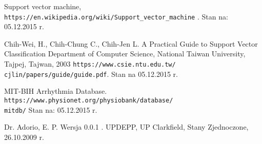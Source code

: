\begin{thebibliography}{99}
Support vector machine,
\newblock \texttt{https://en.wikipedia.org/wiki/Support\_vector\_machine} .
\newblock Stan na: 05.12.2015 r.

Chih-Wei, H., Chih-Chung C., Chih-Jen L.
\newblock A Practical Guide to Support Vector Classification
\newblock Department of Computer Science, National Taiwan University, Tajpej, Tajwan, 2003
\newblock \texttt{https://www.csie.ntu.edu.tw/~ cjlin/papers/guide/guide.pdf}.
\newblock Stan na 05.12.2015 r.

MIT-BIH Arrhythmia Database.
\newblock \texttt{https://www.physionet.org/physiobank/database/\\mitdb/}
\newblock Stan na: 05.12.2015 r.

Dr. Adorio, E. P. 
\newblock Wersja 0.0.1 .
\newblock UPDEPP, UP Clarkfield, Stany Zjednoczone, 26.10.2009 r.


\end{thebibliography}